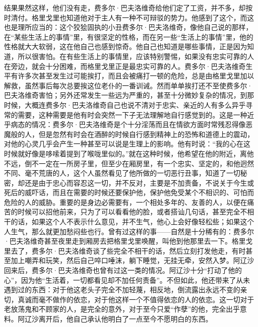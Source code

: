 \par 结果果然这样，他们没有走，费多尔·巴夫洛维奇给他们定了工资，并不多，却按时清付。格里戈里也知道他对于主人有一种不可辩驳的势力。他感到了这个，而这也是理所应当的：这个狡狯固执的小丑费多尔·巴夫洛维奇，像他自己说的那样，在“某些生活上的事情”里，有很坚定的性格，而在另一些“生活上的事情”里，他的性格就大大软弱，这在他自己也感到惊奇。他自己也知道是哪些事情，正是因为知道，所以很害怕。在有些生活上的事情里，应该特别警惕，如果没有忠实可靠的人在旁边，就会十分困难，而格里戈里正是最忠实可靠的人。费多尔·巴夫洛维奇生平有许多次甚至发生过可能挨打，而且会被痛打一顿的危险，总是由格里戈里加以解救，虽然事后每次总要挨这位老仆的一番训诫。然而单单挨打还不至使费多尔·巴夫洛维奇害怕；另外还常发生一些远为严重的，甚至十分微妙复杂的情况，到那时候，大概连费多尔·巴夫洛维奇自己也说不清对于忠实、亲近的人有多么异乎寻常的需要，这种需要是他有时会突然一下子无法理解地自行感觉到的。这是一种近乎病态的情况：费多尔·巴夫洛维奇是个十分淫荡而且在情欲方面时常残忍得像恶魔般的人，但是忽然有时会在酒醉的时候自行感到精神上的恐怖和道德上的震动，对他的心灵几乎会产生一种甚至可以说是生理上的影响。他有时说：“我的心在这时候就好像是哆嗦着提到了喉咙里似的。”就在这种时候，他希望在他的附近，离他不远，倒不一定在一所房子里，但至少在厢房里，有一个忠实、坚定的，和他迥然不同、毫不荒唐的人，这个人虽然看见了他所做的一切恶行丑事，知道了一切秘密，却还是由于忠心而容忍这一切，并不反对，主要是不加责备，不说关于今生或死后的威吓话，而且在需要的时候还要保护他，保护他免受某个不相识的、可怕而危险的人的威胁。重要的是身边必需要有，一个相处多年的、友善的人，以便在痛苦的时候可以招他前来，只为了可以看看他的脸，或者搭讪几句话，甚至完全不相干的话，如果这个人不表示什么意见，并不生气，他心上会好像轻松些；如果这个人生气，那么就更加愁闷些也行。曾有过这样的事——自然是十分稀有的：费多尔·巴夫洛维奇甚至夜里走到厢房去把格里戈里唤醒，叫他到他那里去一下。格里戈里去了，费多尔·巴夫洛维奇谈了些完全不相干的话，然后立刻打发他走，有时甚至加上嘲弄和玩笑，然后自己啐口唾沫，躺下睡觉，无挂无牵，安然入梦。阿辽沙回来后，费多尔·巴夫洛维奇也曾有过这一类的情况。阿辽沙十分“打动了他的心”，因为他“生活着，一切都看见却不加任何责备”。不但如此，他还带来了从未遇到过的东西：对于他这老头子完全不加轻蔑，相反地，倒流露出永远不变的亲切，真诚而毫不做作的依恋，对于他这样一个不值得依恋的人的依恋。这一切对于老放荡鬼和不顾家的人，是完全的意外，对于至今只爱“作孽”的他，完全出乎意料。阿辽沙离开后，他自己承认他明白了一点至今不愿明白的东西。
